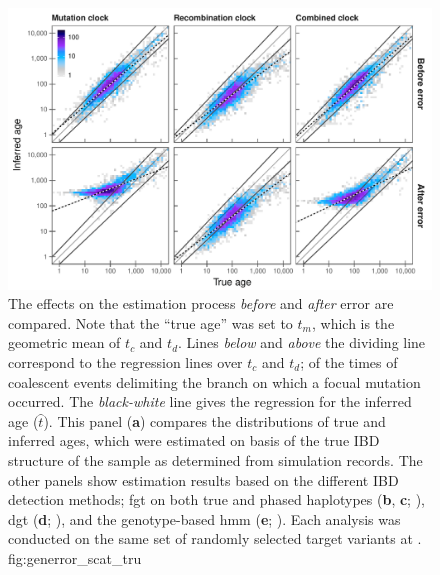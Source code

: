

\begin{figure}[tb]
{\small{}} \\
\includegraphics[width=\textwidth]{./img/ch5/generror_scat_tru}
{The effects on the estimation process \emph{before} and \emph{after} error are compared.
Note that the ``true age'' was set to $t_m$, which is the geometric mean of $t_c$ and $t_d$.
Lines \emph{below} and \emph{above} the dividing line correspond to the regression lines over $t_c$ and $t_d$; \ie of the times of coalescent events delimiting the branch on which a focual mutation occurred.
The \emph{black-white} line gives the regression for the inferred age ($\hat{t}$).
This panel (\textbf{a}) compares the distributions of true and inferred ages, which were estimated on basis of the true IBD structure of the sample as determined from simulation records.
The other panels show estimation results based on the different IBD detection methods;
\gls{fgt} on both true and phased haplotypes (\textbf{b}, \textbf{c}; ),
\gls{dgt} (\textbf{d}; ),
and the genotype-based \gls{hmm} (\textbf{e}; ).
Each analysis was conducted on the same set of  randomly selected target variants at \fk{[2,25]}.}
{fig:generror_scat_tru}
\end{figure}
